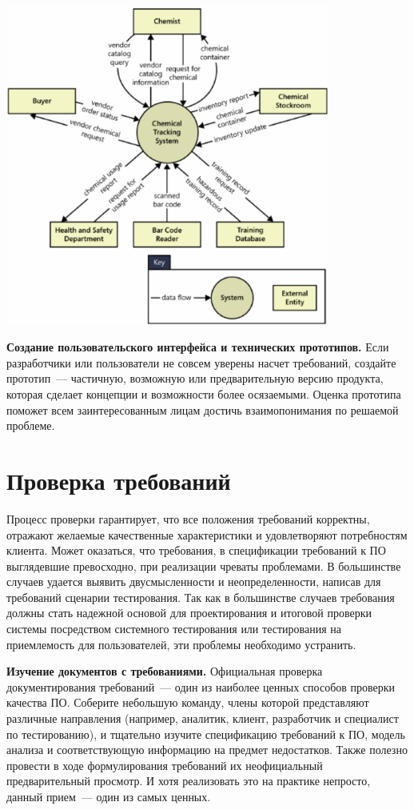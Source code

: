 \documentclass{../../text-style}
\begin{document}
\begin{center}
    \includegraphics[width=0.8\textwidth]{contextDiagram.png}
\end{center}

\textbf{Создание пользовательского интерфейса и технических прототипов.} Если разработчики или пользователи не совсем уверены насчет требований, создайте прототип~--- частичную, возможную или предварительную версию продукта, которая сделает концепции и возможности более осязаемыми. Оценка прототипа поможет всем заинтересованным лицам достичь взаимопонимания по решаемой проблеме.

\section{Проверка требований}

Процесс проверки гарантирует, что все положения требований корректны, отражают желаемые качественные характеристики и удовлетворяют потребностям клиента. Может оказаться, что требования, в спецификации требований к ПО выглядевшие превосходно, при реализации чреваты проблемами. В большинстве случаев удается выявить двусмысленности и неопределенности, написав для требований сценарии тестирования. Так как в большинстве случаев требования должны стать надежной основой для проектирования и итоговой проверки системы посредством системного тестирования или тестирования на приемлемость для пользователей, эти проблемы необходимо устранить.

\textbf{Изучение документов с требованиями.} Официальная проверка документирования требований~--- один из наиболее ценных способов проверки качества ПО. Соберите небольшую команду, члены которой представляют различные направления (например, аналитик, клиент, разработчик и специалист по тестированию), и тщательно изучите спецификацию требований к ПО, модель анализа и соответствующую информацию на предмет недостатков. Также полезно провести в ходе формулирования требований их неофициальный предварительный просмотр. И хотя реализовать это на практике непросто, данный прием~--- один из самых ценных.
\end{document}
